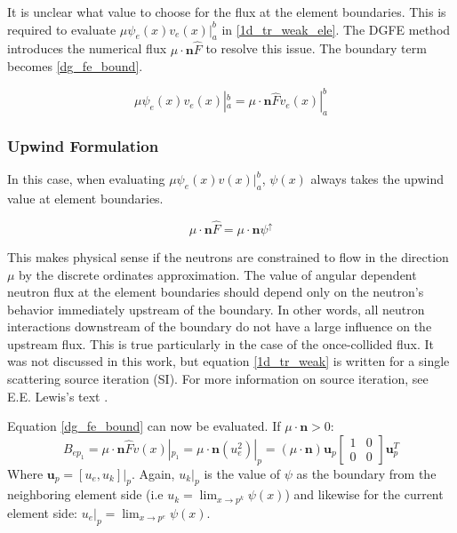 It is unclear what value to choose for the flux at the element boundaries.  This is required to evaluate $\mu \psi_e(x) v_e(x)|_a^b$ in \ref{1d_tr_weak_ele}. The DGFE method introduces the numerical flux $\mu \cdot \mathbf n \hat{F} $ to resolve this issue.  The boundary term becomes \ref{dg_fe_bound}.

\begin{equation}
\mu \psi_e(x) v_e(x)|_a^b = \mu \cdot \mathbf n \hat{F}  v_e(x)|_a^b 
\label{dg_fe_bound}
\end{equation}

\subsubsection{Upwind Formulation}
In this case, when evaluating $\mu \psi_e(x) v(x)|_a^b$, $\psi(x)$ always takes the upwind value at element boundaries.

\begin{equation}
\mu \cdot \mathbf n \hat{F}  = \mu \cdot \mathbf n \psi^{\uparrow} 
\end{equation}

This makes physical sense if the neutrons are constrained to flow in the direction $\mu$ by the discrete ordinates approximation.  The value of angular dependent neutron flux at the element boundaries should depend only on the neutron's behavior immediately upstream of the boundary.  In other words, all neutron interactions downstream of the boundary do not have a large influence on the upstream flux.  This is true particularly in the case of the once-collided flux.  It was not discussed in this work, but equation \ref{1d_tr_weak} is written for a single scattering source iteration (SI).  For more information on source iteration, see E.E. Lewis's text \cite{Lewis}.

Equation \ref{dg_fe_bound} can now be evaluated.
If $\mu \cdot \mathbf n > 0$: 
\begin{equation}
B_{ep_1} = \mu \cdot \hat{\mathbf n} \hat{F}  v(x)|_{p_1} = 
\mu \cdot \mathbf n (u_e^2)|_p = 
(\mu \cdot \mathbf n) \mathbf u_p 
\begin{bmatrix}
    1      & 0 \\
    0      & 0 
\end{bmatrix}
\mathbf u_p^T
\end{equation}
Where $\mathbf u_p = [u_e, u_k]|_p$.  Again, $u_k|_p$ is the value of $\psi$ as the boundary from the neighboring element side (i.e $u_k=\lim_{x \to p^k}\psi(x)$)  and likewise for the current element side: $u_e|_p=\lim_{x \to p^e}\psi(x)$.

